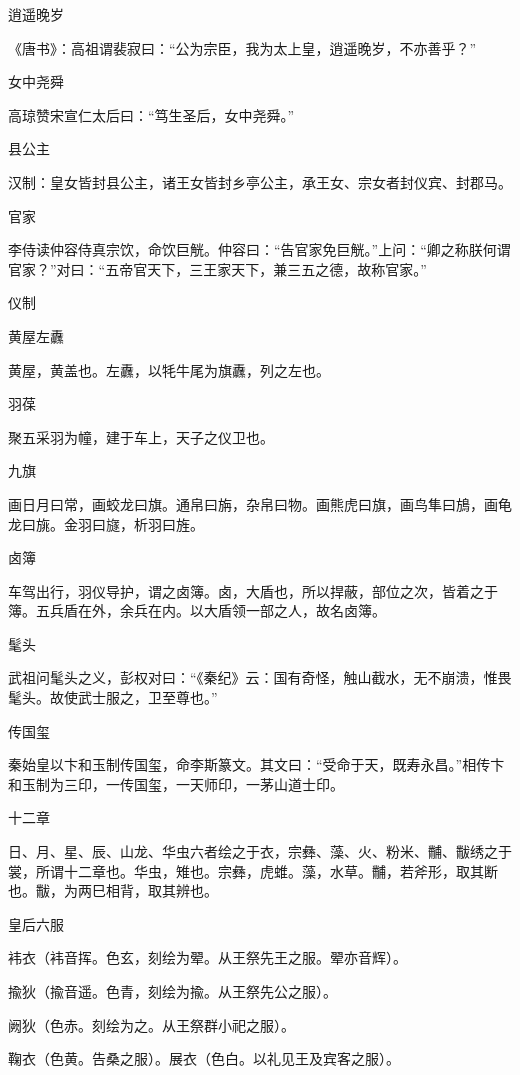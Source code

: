\documentclass[a4paper,12pt,UTF8,twoside]{ctexbook}
\begin{document}
    逍遥晚岁
    
    《唐书》：高祖谓裴寂曰：“公为宗臣，我为太上皇，逍遥晚岁，不亦善乎？”
    
    女中尧舜
    
    高琼赞宋宣仁太后曰：“笃生圣后，女中尧舜。”
    
    县公主
    
    汉制：皇女皆封县公主，诸王女皆封乡亭公主，承王女、宗女者封仪宾、封郡马。
    
    官家
    
    李侍读仲容侍真宗饮，命饮巨觥。仲容曰：“告官家免巨觥。”上问：“卿之称朕何谓官家？”对曰：“五帝官天下，三王家天下，兼三五之德，故称官家。”
    
    仪制
    
    黄屋左纛
    
    黄屋，黄盖也。左纛，以牦牛尾为旗纛，列之左也。
    
    羽葆
    
    聚五采羽为幢，建于车上，天子之仪卫也。
    
    九旗
    
    画日月曰常，画蛟龙曰旗。通帛曰旃，杂帛曰物。画熊虎曰旗，画鸟隼曰鴋，画龟龙曰旐。金羽曰旞，析羽曰旌。
    
    卤簿
    
    车驾出行，羽仪导护，谓之卤簿。卤，大盾也，所以捍蔽，部位之次，皆着之于簿。五兵盾在外，余兵在内。以大盾领一部之人，故名卤簿。
    
    髦头
    
    武祖问髦头之义，彭权对曰：“《秦纪》云：国有奇怪，触山截水，无不崩溃，惟畏髦头。故使武士服之，卫至尊也。”
    
    传国玺
    
    秦始皇以卞和玉制传国玺，命李斯篆文。其文曰：“受命于天，既寿永昌。”相传卞和玉制为三印，一传国玺，一天师印，一茅山道士印。
    
    十二章
    
    日、月、星、辰、山龙、华虫六者绘之于衣，宗彝、藻、火、粉米、黼、黻绣之于裳，所谓十二章也。华虫，雉也。宗彝，虎蜼。藻，水草。黼，若斧形，取其断也。黻，为两巳相背，取其辨也。
    
    皇后六服
    
    袆衣（袆音挥。色玄，刻绘为翚。从王祭先王之服。翚亦音辉）。
    
    揄狄（揄音遥。色青，刻绘为揄。从王祭先公之服）。
    
    阙狄（色赤。刻绘为之。从王祭群小祀之服）。
    
    鞠衣（色黄。告桑之服）。展衣（色白。以礼见王及宾客之服）。
    
\end{document}
